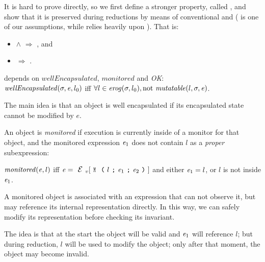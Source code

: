 It is hard to prove  directly,
so we first define a stronger property,
called , and
show that it is preserved during reductions by means of conventional
 and  ( is one of our assumptions,
while  relies heavily upon ).
That is:
\begin{itemize}
\item {} $\wedge$  $\Rightarrow$ , and
\item {} $\Rightarrow$ .
\end{itemize}


 depends on
$\mathit{wellEncapsulated}$, $\mathit{monitored}$
and \emph{OK}:\\
\indent $\mathit{wellEncapsulated}(\sigma,{\mathit{e}},l_0)$ iff
$\forall l \in \mathit{erog}(\sigma,l_0), \text{not}\ \mathit{mutatable}(l,\sigma,{\mathit{e}})$.%

\noindent The main idea is that an object is well encapsulated if its encapsulated state cannot be
modified by $e$.

An object is \emph{monitored} if execution
is currently inside of a monitor for that object, and
the monitored expression ${\mathit{e}}_1$ does not
contain $l$ as a \emph{proper} subexpression:

\indent $\mathit{monitored}({\mathit{e}},l)$ iff
$\e=\ctx_v[\M{l}{\e_1}{\e_2}]$ and either ${\mathit{e}}_1=l$, or $l$ is not inside ${\mathit{e}}_1$.%

\noindent A monitored object is associated with an expression that can not observe it, but may
reference its internal representation directly.
In this way, we can safely modify its representation before checking its invariant.

The idea is that at the start the object will be valid and ${\mathit{e}}_1$ will reference $l$;
but during reduction, $l$ will be used to
modify the object; only after that moment, the object may become invalid.


